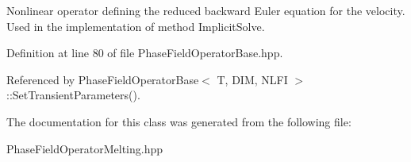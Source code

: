 Nonlinear operator defining the reduced backward Euler equation for the velocity. Used in the implementation of method Implicit\+Solve. 

Definition at line 80 of file Phase\+Field\+Operator\+Base.\+hpp.



Referenced by Phase\+Field\+Operator\+Base$<$ T, D\+I\+M, N\+L\+F\+I $>$\+::\+Set\+Transient\+Parameters().



The documentation for this class was generated from the following file\+:\begin{DoxyCompactItemize}
\item 
Phase\+Field\+Operator\+Melting.\+hpp\end{DoxyCompactItemize}
